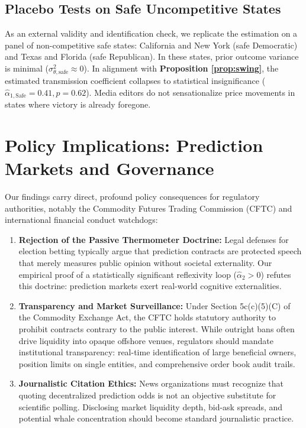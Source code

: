 \documentclass[12pt, a4paper]{article}
\begin{document}
\subsection{Placebo Tests on Safe Uncompetitive States}
As an external validity and identification check, we replicate the estimation on a panel of non-competitive safe states: California and New York (safe Democratic) and Texas and Florida (safe Republican). In these states, prior outcome variance is minimal ($\sigma_{\theta, \text{safe}}^2 \approx 0$). In alignment with \textbf{Proposition \ref{prop:swing}}, the estimated transmission coefficient collapses to statistical insignificance ($\hat{\alpha}_{1, \text{Safe}} = 0.41, p = 0.62$). Media editors do not sensationalize price movements in states where victory is already foregone.

\section{Policy Implications: Prediction Markets and Governance}
\label{sec:policy}

Our findings carry direct, profound policy consequences for regulatory authorities, notably the Commodity Futures Trading Commission (CFTC) and international financial conduct watchdogs:
\begin{enumerate}
    \item \textbf{Rejection of the Passive Thermometer Doctrine:} Legal defenses for election betting typically argue that prediction contracts are protected speech that merely measures public opinion without societal externality. Our empirical proof of a statistically significant reflexivity loop ($\hat{\alpha}_2 > 0$) refutes this doctrine: prediction markets exert real-world cognitive externalities.
    \item \textbf{Transparency and Market Surveillance:} Under Section 5c(c)(5)(C) of the Commodity Exchange Act, the CFTC holds statutory authority to prohibit contracts contrary to the public interest. While outright bans often drive liquidity into opaque offshore venues, regulators should mandate institutional transparency: real-time identification of large beneficial owners, position limits on single entities, and comprehensive order book audit trails.
    \item \textbf{Journalistic Citation Ethics:} News organizations must recognize that quoting decentralized prediction odds is not an objective substitute for scientific polling. Disclosing market liquidity depth, bid-ask spreads, and potential whale concentration should become standard journalistic practice.
\end{enumerate}
\end{document}
